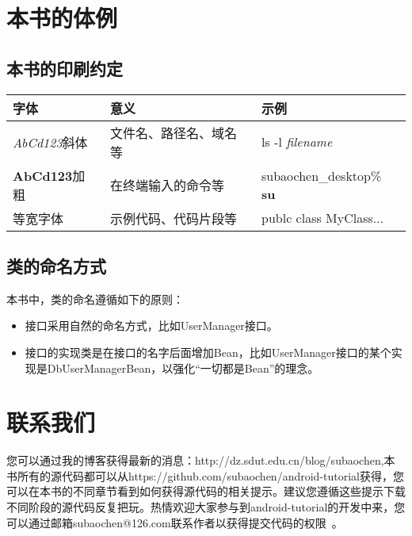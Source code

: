 \section*{本书的体例}
\subsection*{本书的印刷约定}
\begin{tabular}{|l|l|l|}
\hline
字体 & 意义 & 示例 \\
        \hline
        \textsl{AbCd123}斜体 & 文件名、路径名、域名等 & ls -l \textsl{filename}\\
            \hline
            \textbf{AbCd123}加粗 & 在终端输入的命令等 & subaochen\_desktop\% \textbf{su} \\
                \hline
                等宽字体 & 示例代码、代码片段等 & publc class MyClass... \\
                    \hline

                    \end{tabular}

                    \subsection*{类的命名方式}
                    本书中，类的命名遵循如下的原则：
                    \begin{itemize}
                    \item 接口采用自然的命名方式，比如UserManager接口。
                    \item 接口的实现类是在接口的名字后面增加Bean，比如UserManager接口的某个实现是DbUserManagerBean，以强化“一切都是Bean”的理念。
                    \end{itemize}
                    \section*{联系我们}
                    您可以通过我的博客获得最新的消息：http://dz.sdut.edu.cn/blog/subaochen,本书所有的源代码都可以从https://github.com/subaochen/android-tutorial获得，您可以在本书的不同章节看到如何获得源代码的相关提示。建议您遵循这些提示下载不同阶段的源代码反复把玩。热情欢迎大家参与到android-tutorial的开发中来，您可以通过邮箱subaochen@126.com联系作者以获得提交代码的权限~\label{参与openeshop开发的方法}。


                    \mainmatter
